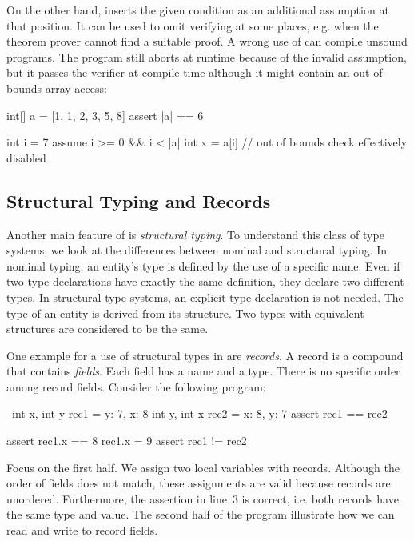 On the other hand,  inserts the given condition as an additional assumption at that position.
It can be used to omit verifying at some places, e.g. when the theorem prover cannot find a suitable proof.
A wrong use of  can compile unsound programs.
The program still aborts at runtime because of the invalid assumption, but it passes the verifier at compile time although it might contain an out-of-bounds array access:

\begin{whileycode}
int[] a = [1, 1, 2, 3, 5, 8]
assert |a| == 6

int i = 7
assume i >= 0 && i < |a|
int x = a[i] // out of bounds check effectively disabled
\end{whileycode}


\subsection{Structural Typing and Records}

Another main feature of \whiley is \emph{structural typing}.
To understand this class of type systems, we look at the differences between nominal and structural typing.
In nominal typing, an entity's type is defined by the use of a specific name.
Even if two type declarations have exactly the same definition, they declare two different types.
In structural type systems, an explicit type declaration is not needed.
The type of an entity is derived from its structure.
Two types with equivalent structures are considered to be the same.

One example for a use of structural types in \whiley are \emph{records}.
A record is a compound that contains \emph{fields}.
Each field has a name and a type.
There is no specific order among record fields.
Consider the following program:

\begin{whileycode}\
{int x, int y} rec1 = {y: 7, x: 8}
{int y, int x} rec2 = {x: 8, y: 7}
assert rec1 == rec2

assert rec1.x == 8
rec1.x = 9
assert rec1 != rec2
\end{whileycode}

Focus on the first half.
We assign two local variables with records.
Although the order of fields does not match, these assignments are valid because records are unordered.
Furthermore, the assertion in line~3 is correct, i.e. both records have the same type and value.
The second half of the program illustrate how we can read and write to record fields.

